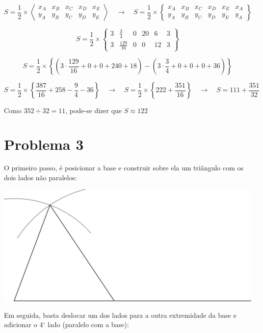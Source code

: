 \documentclass[a4paper,12pt,final]{article}
\newcommand{\qrq}{\quad\rightarrow\quad}
\begin{document}
$$
S = \frac{1}{2}\times
\left\langle\begin{array}{ccccc}
  x_A & x_B & x_C & x_D & x_E\\
  y_A & y_B & y_C & y_D & y_E
\end{array}\right\rangle \qrq
%
S = \frac{1}{2}\times
\left\{\begin{array}{cccccc}
  x_A & x_B & x_C & x_D & x_E & x_A\\
  y_A & y_B & y_C & y_D & y_E & y_A
\end{array}\right\}
$$

$$
S = \frac{1}{2}\times
\left\{\begin{array}{cccccc}
3 & \frac{3}{4} & 0 & 20 & 6 & 3\\[.1cm]
3 & \frac{129}{16} & 0 & 0 & 12 & 3
\end{array}\right\}
$$

$$
S = \frac{1}{2}\times\left\{\left(3\cdot
\frac{129}{16} + 0 + 0 + 240 + 18\right) -
\left(3\cdot\frac{3}{4} + 0 + 0 + 0 + 36\right)\right\}
$$

$$
S = \frac{1}{2}\times\left\{\frac{387}{16} + 258 - \frac{9}{4} - 36\right\}
  \qrq
S = \frac{1}{2}\times\left\{222 + \frac{351}{16}\right\} \qrq
S = 111 + \frac{351}{32}
$$

Como $352 \div 32 = 11$, pode-se dizer que $\boxed{S \approx 122}$


\section*{Problema 3}

O primeiro passo, é posicionar a base e construir sobre ela um triângulo
com os dois lados não paralelos:

\begin{center}
  \includegraphics[scale=.12]{img/passo1}
\end{center}
\vfill

Em seguida, basta deslocar um dos lados para a outra extremidade da base e
adicionar o 4$^{\circ}$ lado (paralelo com a base):
\end{document}
